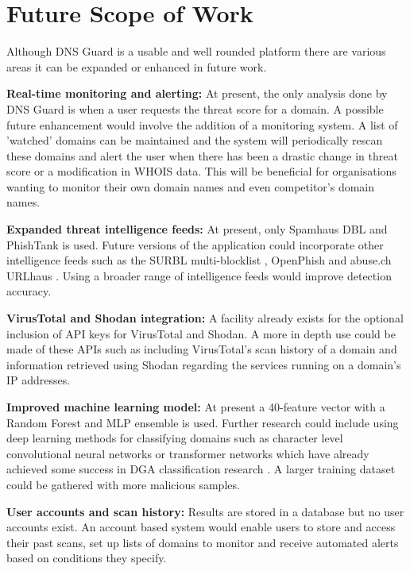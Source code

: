 \documentclass[12pt, a4paper, oneside]{report}
\begin{document}
\section{Future Scope of Work}

Although DNS Guard is a usable and well rounded platform there are various areas it can be expanded or enhanced in future work.

\textbf{Real-time monitoring and alerting:} At present, the only analysis done by DNS Guard is when a user requests the threat score for a domain. A possible future enhancement would involve the addition of a monitoring system. A list of 'watched' domains can be maintained and the system will periodically rescan these domains and alert the user when there has been a drastic change in threat score or a modification in WHOIS data. This will be beneficial for organisations wanting to monitor their own domain names and even competitor's domain names.

\textbf{Expanded threat intelligence feeds:} At present, only Spamhaus DBL and PhishTank is used. Future versions of the application could incorporate other intelligence feeds such as the SURBL multi-blocklist \cite{surbl2024}, OpenPhish \cite{openphish2024} and abuse.ch URLhaus \cite{urlhaus2024}. Using a broader range of intelligence feeds would improve detection accuracy.

\textbf{VirusTotal and Shodan integration:} A facility already exists for the optional inclusion of API keys for VirusTotal and Shodan. A more in depth use could be made of these APIs such as including VirusTotal's scan history of a domain and information retrieved using Shodan regarding the services running on a domain's IP addresses.

\textbf{Improved machine learning model:} At present a 40-feature vector with a Random Forest and MLP ensemble is used. Further research could include using deep learning methods for classifying domains such as character level convolutional neural networks or transformer networks which have already achieved some success in DGA classification research \cite{woodbridge2016dga}. A larger training dataset could be gathered with more malicious samples.

\textbf{User accounts and scan history:} Results are stored in a database but no user accounts exist. An account based system would enable users to store and access their past scans, set up lists of domains to monitor and receive automated alerts based on conditions they specify.
\end{document}
